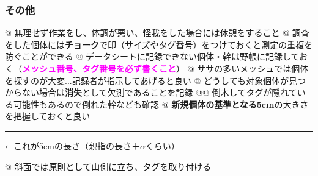 \documentclass[12pt,a4paper]{extarticle}
\newcommand{\point}[1]
{\textbf{\textcolor{magenta}{#1}}}
\begin{document}
\subsubsection*{その他}

\begin{easylist}[itemize]
@ 無理せず作業をし、体調が悪い、怪我をした場合には休憩をすること
@ 調査をした個体には\textbf{チョーク}で印（サイズやタグ番号）をつけておくと測定の重複を防ぐことができる
@ データシートに記録できない個体・幹は野帳に記録しておく（\point{メッシュ番号、タグ番号を必ず書くこと}）
@ ササの多いメッシュでは個体を探すのが大変...記録者が指示してあげると良い
@ どうしても対象個体が見つからない場合は\textbf{消失}として欠測であることを記録
@@ 倒木してタグが隠れている可能性もあるので倒れた幹なども確認
@ \textbf{新規個体の基準となる5cm}の大きさを把握しておくと良い

\rule{5.2cm}{1.4pt}←これが5cmの長さ（親指の長さ＋$\alpha$くらい）

@ 斜面では原則として山側に立ち、タグを取り付ける
\end{easylist}
\end{document}
